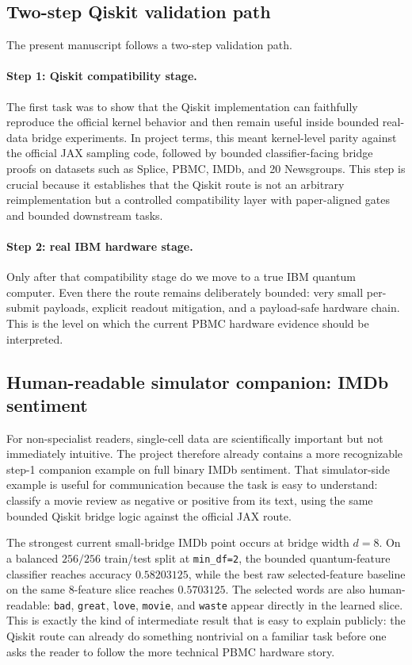 \documentclass[11pt]{article}
\begin{document}
\subsection{Two-step Qiskit validation path}

The present manuscript follows a two-step validation path.

\paragraph{Step 1: Qiskit compatibility stage.}
The first task was to show that the Qiskit implementation can faithfully reproduce the official kernel behavior and then remain useful inside bounded real-data bridge experiments. In project terms, this meant kernel-level parity against the official JAX sampling code, followed by bounded classifier-facing bridge proofs on datasets such as Splice, PBMC, IMDb, and 20 Newsgroups. This step is crucial because it establishes that the Qiskit route is not an arbitrary reimplementation but a controlled compatibility layer with paper-aligned gates and bounded downstream tasks.

\paragraph{Step 2: real IBM hardware stage.}
Only after that compatibility stage do we move to a true IBM quantum computer. Even there the route remains deliberately bounded: very small per-submit payloads, explicit readout mitigation, and a payload-safe hardware chain. This is the level on which the current PBMC hardware evidence should be interpreted.

\subsection{Human-readable simulator companion: IMDb sentiment}

For non-specialist readers, single-cell data are scientifically important but not immediately intuitive. The project therefore already contains a more recognizable step-1 companion example on full binary IMDb sentiment. That simulator-side example is useful for communication because the task is easy to understand: classify a movie review as negative or positive from its text, using the same bounded Qiskit bridge logic against the official JAX route.

The strongest current small-bridge IMDb point occurs at bridge width $d=8$. On a balanced $256/256$ train/test split at \texttt{min\_df=2}, the bounded quantum-feature classifier reaches accuracy $0.58203125$, while the best raw selected-feature baseline on the same $8$-feature slice reaches $0.5703125$. The selected words are also human-readable: \texttt{bad}, \texttt{great}, \texttt{love}, \texttt{movie}, and \texttt{waste} appear directly in the learned slice. This is exactly the kind of intermediate result that is easy to explain publicly: the Qiskit route can already do something nontrivial on a familiar task before one asks the reader to follow the more technical PBMC hardware story.
\end{document}
